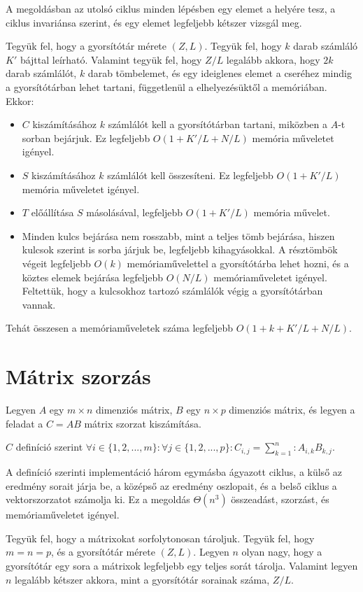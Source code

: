 \documentclass[12pt]{report}
\begin{document}
A megoldásban az utolsó ciklus minden lépésben egy elemet a helyére tesz,
a ciklus invariánsa szerint, és egy elemet legfeljebb kétszer vizsgál meg.

Tegyük fel, hogy a gyorsítótár mérete $(Z, L)$.
Tegyük fel, hogy $k$ darab számláló $K'$ bájttal leírható.
Valamint tegyük fel, hogy $Z/L$ legalább akkora,
hogy $2k$ darab számlálót, $k$ darab tömbelemet,
és egy ideiglenes elemet a cseréhez
mindig a gyorsítótárban lehet tartani,
függetlenül a elhelyezésüktől a memóriában.
Ekkor:
\begin{itemize}
\item $C$ kiszámításához $k$ számlálót kell a gyorsítótárban tartani,
miközben a $A$-t sorban bejárjuk.
Ez legfeljebb $O(1+K'/L+N/L)$ memória műveletet igényel.
\item $S$ kiszámításához $k$ számlálót kell összesíteni.
Ez legfeljebb $O(1+K'/L)$ memória műveletet igényel.
\item $T$ előállítása $S$ másolásával,
legfeljebb $O(1+K'/L)$ memória művelet.
\item Minden kulcs bejárása nem rosszabb, mint a teljes tömb bejárása,
hiszen kulcsok szerint is sorba járjuk be, legfeljebb kihagyásokkal.
A résztömbök végeit legfeljebb $O(k)$ memóriaművelettel a gyorsítótárba
lehet hozni, és a köztes elemek bejárása legfeljebb $O(N/L)$ memóriaműveletet
igényel.
Feltettük, hogy a kulcsokhoz tartozó számlálók végig
a gyorsítótárban vannak.
\end{itemize}
Tehát összesen a memóriaműveletek száma legfeljebb
$O(1+k+K'/L+N/L)$.

\section{Mátrix szorzás}

Legyen $A$ egy $m \times n$ dimenziós mátrix,
$B$ egy $n \times p$ dimenziós mátrix,
és legyen a feladat a $C=AB$ mátrix szorzat kiszámítása.

$C$ definíció szerint
$\forall i \in \{1, 2, ..., m\}: \forall j \in \{1, 2, ..., p\}: C_{i, j} = \sum_{k=1}^n: A_{i,k} B_{k,j}$.

A definíció szerinti implementáció három egymásba ágyazott ciklus,
a külső az eredmény sorait járja be,
a középső az eredmény oszlopait,
és a belső ciklus a vektorszorzatot számolja ki.
Ez a megoldás $\Theta(n^3)$ összeadást, szorzást, és memóriaműveletet igényel.

Tegyük fel, hogy a mátrixokat sorfolytonosan tároljuk.
Tegyük fel, hogy $m=n=p$, és a gyorsítótár mérete $(Z, L)$.
Legyen $n$ olyan nagy, hogy a gyorsítótár egy sora a mátrixok legfeljebb egy teljes sorát
tárolja.
Valamint legyen $n$ legalább kétszer akkora, mint a gyorsítótár sorainak száma, $Z/L$.
\end{document}
